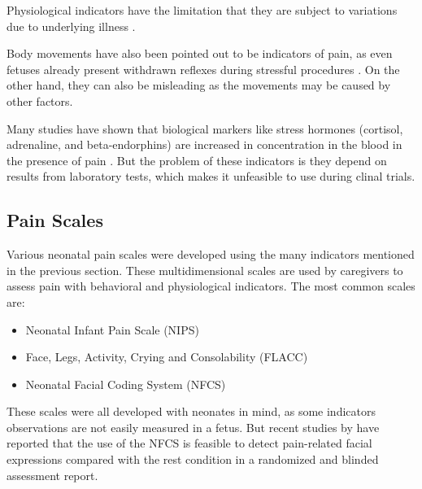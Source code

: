 
Physiological indicators have the limitation that they are subject to variations due to underlying illness \citep{sweet1998physiological}.

Body movements have also been pointed out to be indicators of pain, as even fetuses already present withdrawn reflexes during stressful procedures \citep{Zimmermann1991}. On the other hand, they can also be misleading as the movements may be caused by other factors. 

Many studies have shown that biological markers like stress hormones (cortisol, adrenaline, and beta-endorphins) are increased in concentration in the blood in the presence of pain \citep{giannakoulopoulos1994fetal}. But the problem of these indicators is they depend on results from laboratory tests, which makes it unfeasible to use during clinal trials.


\subsection{Pain Scales}

Various neonatal pain scales were developed using the many indicators mentioned in the previous section. These multidimensional scales are used by caregivers to assess pain with behavioral and physiological indicators. The most common scales are:

\begin{itemize}
    \item Neonatal Infant Pain Scale (NIPS)
    \item Face, Legs, Activity, Crying and Consolability (FLACC)
    \item Neonatal Facial Coding System (NFCS)
\end{itemize}

These scales were all developed with neonates in mind, as some indicators observations are not easily measured in a fetus. But recent studies by \citeauthor{bernardes2018feasibility} have reported that the use of the NFCS is feasible to detect pain-related facial expressions compared with the rest condition in a randomized and blinded assessment report.

